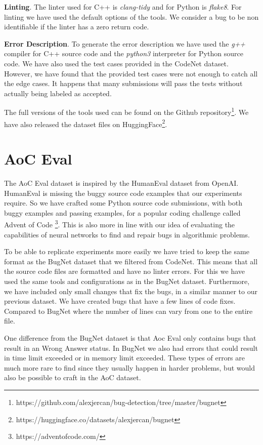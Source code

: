 \documentclass[12pt,a4paper]{report}
\begin{document}
\textbf{Linting}. The linter used for C++ is \textit{clang-tidy} and for Python is \textit{flake8}. For linting we have used the default options of the tools. We consider a bug to be non identifiable if the linter has a zero return code.

\textbf{Error Description}. To generate the error description we have used the \textit{g++} compiler for C++ source code and the \textit{python3} interpreter for Python source code. We have also used the test cases provided in the CodeNet dataset. However, we have found that the provided test cases were not enough to catch all the edge cases. It happens that many submissions will pass the tests without actually being labeled as accepted.

The full versions of the tools used can be found on the Github repository\footnote{https://github.com/alexjercan/bug-detection/tree/master/bugnet}. We have also released the dataset files on HuggingFace\footnote{https://huggingface.co/datasets/alexjercan/bugnet}.

\section{AoC Eval} 

The AoC Eval dataset is inspired by the HumanEval dataset from OpenAI. HumanEval is missing the buggy source code examples that our experiments require. So we have crafted some Python source code submissions, with both buggy examples and passing examples, for a popular coding challenge called Advent of Code \footnote{https://adventofcode.com/}. This is also more in line with our idea of evaluating the capabilities of neural networks to find and repair bugs in algorithmic problems.

To be able to replicate experiments more easily we have tried to keep the same format as the BugNet dataset that we filtered from CodeNet. This means that all the source code files are formatted and have no linter errors. For this we have used the same tools and configurations as in the BugNet dataset. Furthermore, we have included only small changes that fix the bugs, in a similar manner to our previous dataset. We have created bugs that have a few lines of code fixes. Compared to BugNet where the number of lines can vary from one to the entire file.

One difference from the BugNet dataset is that Aoc Eval only contains bugs that result in an Wrong Answer status. In BugNet we also had errors that could result in time limit exceeded or in memory limit exceeded. These types of errors are much more rare to find since they usually happen in harder problems, but would also be possible to craft in the AoC dataset.
\end{document}
